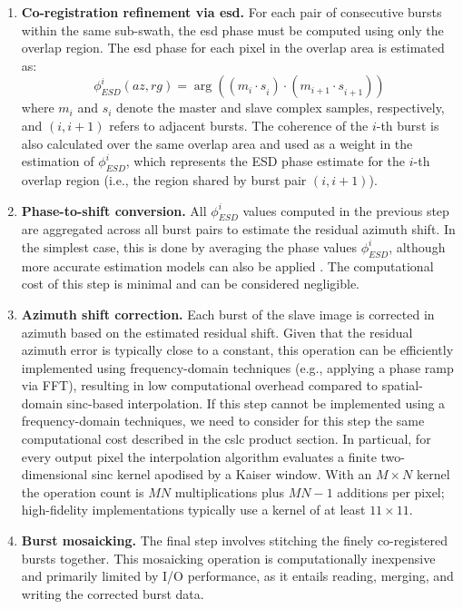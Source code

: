 \begin{enumerate}
\item \textbf{Co-registration refinement via \acs{esd}.} For each pair of consecutive bursts within the same sub-swath, the \acs{esd} phase must be computed using only the overlap region. The \acs{esd} phase for each pixel in the overlap area is estimated as:
\begin{equation}
\phi_{ESD}^i(az, rg) = \arg\left((m_{i} \cdot s_{i}^{}) \cdot (m_{i+1} \cdot s_{i+1}^{})\right)
\label{eq:esd_phase}
\end{equation}
where $m_i$ and $s_i$ denote the master and slave complex samples, respectively, and $(i, i+1)$ refers to adjacent bursts. The coherence of the $i$-th burst is also calculated over the same overlap area and used as a weight in the estimation of $\phi_{ESD}^i$, which represents the ESD phase estimate for the $i$-th overlap region (i.e., the region shared by burst pair $(i, i+1)$).

\item \textbf{Phase-to-shift conversion.} All $\phi_{ESD}^i$ values computed in the previous step are aggregated across all burst pairs to estimate the residual azimuth shift. In the simplest case, this is done by averaging the phase values $\phi_{ESD}^i$, although more accurate estimation models can also be applied \citep{Martínez2016}. The computational cost of this step is minimal and can be considered negligible.

\item \textbf{Azimuth shift correction.} Each burst of the slave image is corrected in azimuth based on the estimated residual shift. Given that the residual azimuth error is typically close to a constant, this operation can be efficiently implemented using frequency-domain techniques (e.g., applying a phase ramp via FFT), resulting in low computational overhead compared to spatial-domain sinc-based interpolation. If this step cannot be implemented using a frequency-domain techniques, we need to consider for this step the same computational cost described in the \acs{cslc} product section. In particual, for every output pixel the interpolation algorithm evaluates a finite two-dimensional sinc kernel apodised by a Kaiser window.  
With an \(M\times N\) kernel the operation count is \(MN\) multiplications plus \(MN-1\) additions per pixel; high-fidelity implementations typically use a kernel of at least \(11\times11\). 

\item \textbf{Burst mosaicking.} The final step involves stitching the finely co-registered bursts together. This mosaicking operation is computationally inexpensive and primarily limited by I/O performance, as it entails reading, merging, and writing the corrected burst data.
\end{enumerate}

